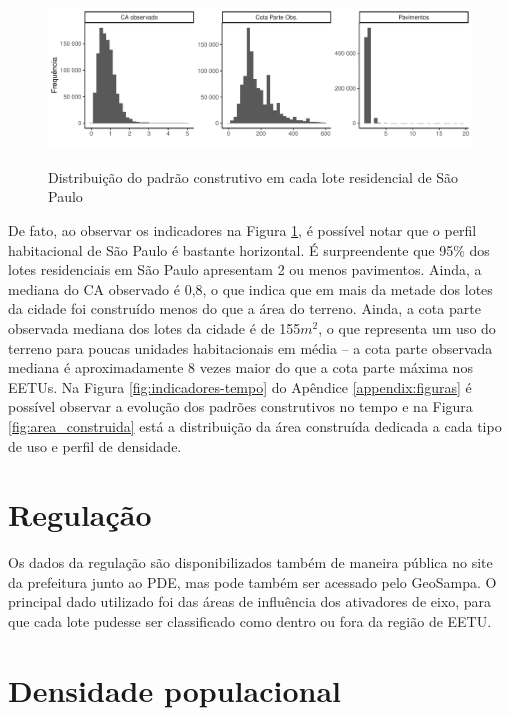 \begin{figure}[h]
    \centering
    \caption{Distribuição do padrão construtivo em cada lote residencial de São Paulo}
    \includegraphics[width = \linewidth]{figuras/indicadores.pdf}
    \label{fig:histogramas}
\end{figure}

De fato, ao observar os indicadores na Figura \ref{fig:histogramas}, é possível notar que o perfil habitacional de São Paulo é bastante horizontal. É surpreendente que 95\% dos lotes residenciais em São Paulo apresentam 2 ou menos pavimentos. Ainda, a mediana do CA observado é 0,8, o que indica que em mais da metade dos lotes da cidade foi construído menos do que a área do terreno. Ainda, a cota parte observada mediana dos lotes da cidade é de 155$m^2$, o que representa um uso do terreno para poucas unidades habitacionais em média -- a cota parte observada mediana é aproximadamente 8 vezes maior do que a cota parte máxima nos EETUs. Na Figura \ref{fig:indicadores-tempo} do Apêndice \ref{appendix:figuras} é possível observar a evolução dos padrões construtivos no tempo e na Figura \ref{fig:area_construida} está a distribuição da área construída dedicada a cada tipo de uso e perfil de densidade.

\section{Regulação}
\label{sec:dadosPDE}

Os dados da regulação são disponibilizados também de maneira pública no site da prefeitura junto ao PDE, mas pode também ser acessado pelo GeoSampa. O principal dado utilizado foi das áreas de influência dos ativadores de eixo, para que cada lote pudesse ser classificado como dentro ou fora da região de EETU.

\section{Densidade populacional}
\label{sec:dadosCenso}

